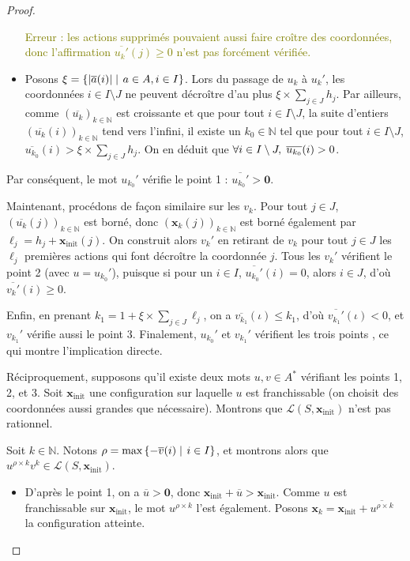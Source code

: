 \documentclass[a4paper,final]{article}
\theoremstyle{definition}
\let\leq\leqslant
\let\geq\geqslant
\newcommand{\lucas}[1]{\textcolor{olive}{#1}}
\newcommand{\set}[2]{\left\{#1\mathrel{\left|\vphantom{#1}\vphantom{#2}\right.}#2\right\}}
\newcommand{\abs}[1]{\ensuremath{\displaystyle\left\lvert #1 \right\rvert}}
\newcommand{\N}{\ensuremath{\mathbb{N}}}
\newcommand{\lang}{\ensuremath{\mathcal{L}}}
\newcommand{\vect}[1]{\ensuremath{\mathbf{#1}}}
\newcommand{\xinit}{\ensuremath{\vect{x}_\text{init}}}
\newcommand{\valeur}[1]{\ensuremath{\overline{#1}}}
\begin{document}
\begin{proof}
\begin{itemize}
    \lucas{Erreur : les actions supprimés pouvaient aussi faire croître des coordonnées, donc l'affirmation $\valeur{u_k'}(j) \geq 0$ n'est pas forcément vérifiée.}
    
    \item Posons $\xi = \set{\abs{\valeur{a}(i)}} {a\in A,i\in I}$.
    Lors du passage de $u_k$ à $u_k'$, les coordonnées $i\in I\setminus J$ ne peuvent décroître d'au plus $\xi \times \sum_{j\in J} h_j$.
    Par ailleurs, comme $(\valeur{u_k})_{k\in\N}$ est croissante et que pour tout $i\in I\setminus J$, la suite d'entiers $(\valeur{u_k}(i))_{k\in\N}$ tend vers l'infini, 
    il existe un $k_0\in\N$ tel que pour tout $i\in I\setminus J$, $\valeur{u_{k_0}}(i) > \xi \times \sum_{j\in J} h_j$.
    On en déduit que $\forall i\in I\setminus J, \hspace{1mm} \valeur{u_{k_0}}(i) > 0$.
\end{itemize}
Par conséquent, le mot $u_{k_0}'$ vérifie le point 1 %
: $\valeur{u_{k_0}'} > \vect{0}$.
\vspace{2mm}

Maintenant, procédons de façon similaire sur les $v_k$.
Pour tout $j\in J$, $(\valeur{u_k}(j))_{k\in\N}$ est borné, donc $(\vect{x}_k(j))_{k\in\N}$ est borné également par $\ell_j = h_j + \xinit(j)$.
On construit alors $v_k'$ en retirant de $v_k$ pour tout $j\in J$ les $\ell_j$ premières actions qui font décroître la coordonnée $j$.
Tous les $v_k'$ vérifient le point 2 (avec $u = u_{k_0}'$), puisque si pour un $i\in I$, $\valeur{u_{k_0}'}(i) = 0$, alors $i\in J$, d'où $\valeur{v_k'}(i) \geq 0$.

Enfin, en prenant $k_1 = 1 + \xi \times \sum_{j\in J} \ell_j$, on a $\valeur{v_{k_1}}(\iota) \leq k_1$, d'où $\valeur{v_{k_1}'}(\iota) < 0$, et $v_{k_1}'$ vérifie aussi le point 3.
Finalement, $u_{k_0}'$ et $v_{k_1}'$ vérifient les trois points %
, ce qui montre l'implication directe.
\vspace{5mm}

Réciproquement, supposons qu'il existe deux mots $u,v\in A^*$ vérifiant les points 1, 2, et 3.
Soit $\xinit$ une configuration sur laquelle $u$ est franchissable (on choisit des coordonnées aussi grandes que nécessaire).
Montrons que $\lang(S,\xinit)$ n'est pas rationnel.

Soit $k\in\N$.
Notons $\rho = \text{max}\set{-\valeur{v}(i)}{i\in I}$, 
et montrons alors que $u^{\rho\times k} v^k \in \lang(S,\xinit)$.

\begin{itemize}
    \item D'après le point 1, on a $\valeur{u} > \vect{0}$, donc $\xinit + \valeur{u} > \xinit$.
    Comme $u$ est franchissable sur $\xinit$, le mot $u^{\rho\times k}$ l'est également.
    Posons $\vect{x}_k = \xinit + \valeur{u^{\rho\times k}}$ la configuration atteinte.
    

\end{itemize}
\end{proof}
\end{document}
